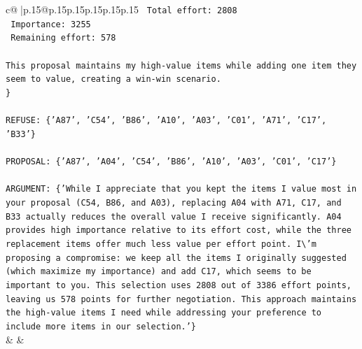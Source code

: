 \documentclass{article}
\begin{document}
{\begin{supertabular}{c@{$\;$}|p{.15\linewidth}@{}p{.15\linewidth}p{.15\linewidth}p{.15\linewidth}p{.15\linewidth}p{.15\linewidth}}
{{{\texttt{   Total effort: 2808} \\
\texttt{   Importance: 3255} \\
\texttt{   Remaining effort: 578} \\
\\ 
\texttt{This proposal maintains my high{-}value items while adding one item they seem to value, creating a win{-}win scenario.} \\
\texttt{\}} \\
\\ 
\texttt{REFUSE: \{'A87', 'C54', 'B86', 'A10', 'A03', 'C01', 'A71', 'C17', 'B33'\}} \\
\\ 
\texttt{PROPOSAL: \{'A87', 'A04', 'C54', 'B86', 'A10', 'A03', 'C01', 'C17'\}} \\
\\ 
\texttt{ARGUMENT: \{'While I appreciate that you kept the items I value most in your proposal (C54, B86, and A03), replacing A04 with A71, C17, and B33 actually reduces the overall value I receive significantly. A04 provides high importance relative to its effort cost, while the three replacement items offer much less value per effort point. I\textbackslash{}'m proposing a compromise: we keep all the items I originally suggested (which maximize my importance) and add C17, which seems to be important to you. This selection uses 2808 out of 3386 effort points, leaving us 578 points for further negotiation. This approach maintains the high{-}value items I need while addressing your preference to include more items in our selection.'\}} \\
            }
        }
    }
    & & \\ \\


\end{supertabular}}
\end{document}
